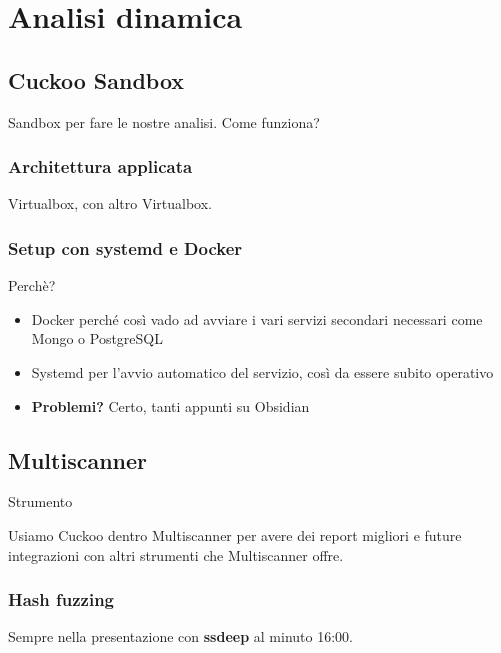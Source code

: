 \chapter{Analisi dinamica}

\section{Cuckoo Sandbox}
Sandbox per fare le nostre analisi.
Come funziona?

\subsection{Architettura applicata}
Virtualbox, con altro Virtualbox.

\subsection{Setup con systemd e Docker}
Perchè?
\begin{itemize}
    \item Docker perché così vado ad avviare i vari servizi secondari necessari come Mongo o PostgreSQL
    \item Systemd per l'avvio automatico del servizio, così da essere subito operativo
    \item \textbf{Problemi?} Certo, tanti appunti su Obsidian
\end{itemize}

\section{Multiscanner}
Strumento \cite{anacondacon_multiscanner}

Usiamo Cuckoo dentro Multiscanner per avere dei report migliori e future integrazioni con altri strumenti che Multiscanner offre.

\subsection{Hash fuzzing}
Sempre nella presentazione \cite{anacondacon_multiscanner} con \textbf{ssdeep} al minuto 16:00.
